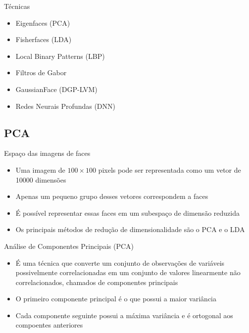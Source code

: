 \begin{frame}{Técnicas}
\begin{itemize}
\item Eigenfaces (PCA)
\item Fisherfaces (LDA)
\item Local Binary Patterns (LBP)
\item Filtros de Gabor
\item GaussianFace (DGP-LVM)
\item Redes Neurais Profundas (DNN)
\end{itemize}
\end{frame}

\subsection{PCA}

\begin{frame}{Espaço das imagens de faces}
\begin{itemize}
\item Uma imagem de $100\times100$ pixels pode ser representada como um vetor de 10000 dimensões
\item Apenas um pequeno grupo desses vetores correspondem a faces
\item É possível representar essas faces em um subespaço de dimensão reduzida
\item Os principais métodos de redução de dimensionalidade são o PCA e o LDA
\end{itemize}
\end{frame}


\begin{frame}{Análise de Componentes Principais (PCA)}
\begin{itemize}
\item É uma técnica que converte um conjunto de observações de variáveis possivelmente correlacionadas em um conjunto de valores linearmente não correlacionados, chamados de componentes principais
\item O primeiro componente principal é o que possui a maior variância
\item Cada componente seguinte possui a máxima variância e é ortogonal aos compoentes anteriores
\end{itemize}
\end{frame}


